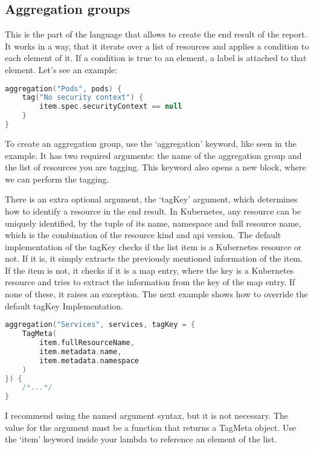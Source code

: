 \subsection{Aggregation groups}

This is the part of the language that allows to create the end result of the report. It works in a way, that it iterate over a list of resources and applies a condition to each element of it. If a condition is true to an element, a label is attached to that element. Let's see an example:

\begin{lstlisting}[caption={Aggregation group example},language=Kotlin,label=code:aggregation_group]
aggregation("Pods", pods) {
    tag("No security context") {
        item.spec.securityContext == null
    }
}
\end{lstlisting}

To create an aggregation group, use the `aggregation' keyword, like seen in the example. It has two required arguments: the name of the aggregation group and the list of resources you are tagging. This keyword also opens a new block, where we can perform the tagging.

There is an extra optional argument, the `tagKey' argument, which determines how to identify a resource in the end result. In Kubernetes, any resource can be uniquely identified, by the tuple of its name, namespace and full resource name, which is the combination of the resource kind and api version. The default implementation of the tagKey checks if the list item is a Kubernetes resource or not. If it is, it simply extracts the previously mentioned information of the item. If the item is not, it checks if it is a map entry, where the key is a Kubernetes resource and tries to extract the information from the key of the map entry. If none of these, it raises an exception. The next example shows how to override the default tagKey Implementation.

\begin{lstlisting}[caption={Override tagKey},language=Kotlin,label=code:tagkey]
aggregation("Services", services, tagKey = {
    TagMeta(
        item.fullResourceName,
        item.metadata.name,
        item.metadata.namespace
    )
}) {
    /*...*/
}
\end{lstlisting}

I recommend using the named argument syntax, but it is not necessary. The value for the argument must be a function that returns a TagMeta object. Use the `item' keyword inside your lambda to reference an element of the list.

